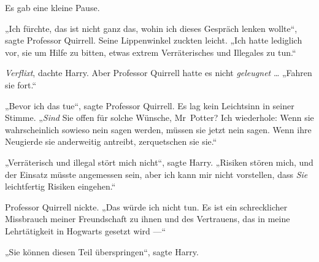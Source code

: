 Es gab eine kleine Pause.

„Ich fürchte, das ist nicht ganz das, wohin ich dieses Gespräch lenken wollte“, sagte Professor Quirrell. Seine Lippenwinkel zuckten leicht.
„Ich hatte lediglich vor, sie um Hilfe zu bitten, etwas extrem Verräterisches und Illegales zu tun.“

\emph{Verflixt}, dachte Harry. Aber Professor Quirrell hatte es nicht \emph{geleugnet} …
„Fahren sie fort.“

„Bevor ich das tue“, sagte Professor Quirrell. Es lag kein Leichtsinn in seiner Stimme.
„\emph{Sind} Sie offen für solche Wünsche, Mr~Potter? Ich wiederhole: Wenn sie wahrscheinlich sowieso nein sagen werden, müssen sie jetzt nein sagen. Wenn ihre Neugierde sie anderweitig antreibt, zerquetschen sie sie.“

„Verräterisch und illegal stört mich nicht“, sagte Harry.
„Risiken stören mich, und der Einsatz müsste angemessen sein, aber ich kann mir nicht vorstellen, dass \emph{Sie} leichtfertig Risiken eingehen.“

Professor Quirrell nickte.
„Das würde ich nicht tun. Es ist ein schrecklicher Missbrauch meiner Freundschaft zu ihnen und des Vertrauens, das in meine Lehrtätigkeit in Hogwarts gesetzt wird —“

„Sie können diesen Teil überspringen“, sagte Harry.

